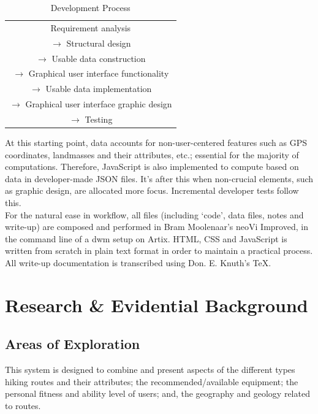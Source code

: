 \documentclass[11pt, english]{article}
\begin{document}
	\begin{table}[h]
		\renewcommand{\arraystretch}{1.25}
	\begin{center}
	\begin{tabular}{c}
		\hline
		\hline
		Requirement analysis\\
		$\rightarrow$ Structural design\\
		$\rightarrow$ Usable data construction\\
		$\rightarrow$ Graphical user interface functionality\\
		$\rightarrow$ Usable data implementation\\
		$\rightarrow$ Graphical user interface graphic design\\
		$\rightarrow$ Testing\\
		\hline
		\hline
	\end{tabular}
		\caption{Development Process}
	\end{center}
	\end{table}

	At this starting point, data accounts for non-user-centered features such as GPS coordinates, landmasses and their attributes, etc.; essential for the majority of computations. Therefore, JavaScript is also implemented to compute based on data in developer-made JSON files. It's after this when non-crucial elements, such as graphic design, are allocated more focus. Incremental developer tests follow this.\\

	For the natural ease in workflow, all files (including `code', data files, notes and write-up) are composed and performed in Bram Moolenaar's neoVi Improved, in the command line of a dwm setup on Artix. HTML, CSS and JavaScript is written from scratch in plain text format in order to maintain a practical process. All write-up documentation is transcribed using Don. E. Knuth's \TeX.

\newpage

\section{Research \& Evidential Background}\label{ch2}

	\subsection{Areas of Exploration}

	This system is designed to combine and present aspects of the different types hiking routes and their attributes; the recommended/available equipment; the personal fitness and ability level of users; and, the geography and geology related to routes.
\end{document}
